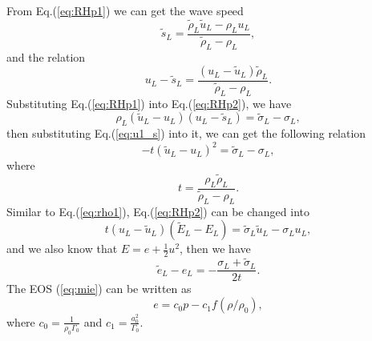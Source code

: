 \documentclass{article}
\theoremstyle{plain}\newtheorem{definition}{\sc{Definition}}
\theoremstyle{defination}\newtheorem{example}{Example}[section]
\numberwithin{equation}{section}
\numberwithin{table}{section}
\begin{document}
 From Eq.(\ref{eq:RHp1}) we can get the wave speed
  \begin{equation}
	\widetilde{s}_L = \frac{\widetilde{\rho}_L \widetilde{u}_L-\rho_Lu_L}{\widetilde{\rho}_L-\rho_L},
  \end{equation}
and the relation
\begin{equation}\label{eq:u1_s}
  u_L-\widetilde{s}_L = \frac{(u_L-\widetilde{u}_L)\widetilde{\rho}_L}{\widetilde{\rho}_L-\rho_L}. 
\end{equation}
Substituting Eq.(\ref{eq:RHp1}) into Eq.(\ref{eq:RHp2}), we have 
\begin{equation}\label{eq:rho1}
  \rho_L(\widetilde{u}_L - u_L)(u_L-\widetilde{s}_L) = \widetilde{\sigma}_L -\sigma_L,
\end{equation}
then substituting Eq.(\ref{eq:u1_s}) into it, we can get the following relation
\begin{equation}\label{eq:tu_2}
  -t(\widetilde{u}_L-u_L)^2 = \widetilde{\sigma}_L-\sigma_L,
\end{equation}
where
\begin{equation}
t=\frac{\rho_L \widetilde{\rho}_L}{\widetilde{\rho}_L-\rho_L}.
\end{equation}
Similar to Eq.(\ref{eq:rho1}), Eq.(\ref{eq:RHp2}) can be changed into 
\begin{equation}
  t(u_L-\widetilde{u}_L)(\widetilde{E}_L-E_L) =\widetilde{\sigma}_L\widetilde{u}_L-\sigma_Lu_L,
\end{equation}
and we also know that $E = e+\frac{1}{2}u^2$, then we have 
\begin{equation}\label{eq:e21}
  \widetilde{e}_L-e_L= -\frac{\sigma_L+\widetilde{\sigma}_L}{2t}.
\end{equation}
The EOS (\ref{eq:mie}) can be written as
\begin{equation} \label{eq:eos1}
  e=c_0 p-c_1f(\rho/\rho_0),
\end{equation}
where $c_0=\frac{1}{\rho_0\Gamma_0}$ and $c_1=\frac{a_0^2}{\Gamma_0}$.  
\end{document}
